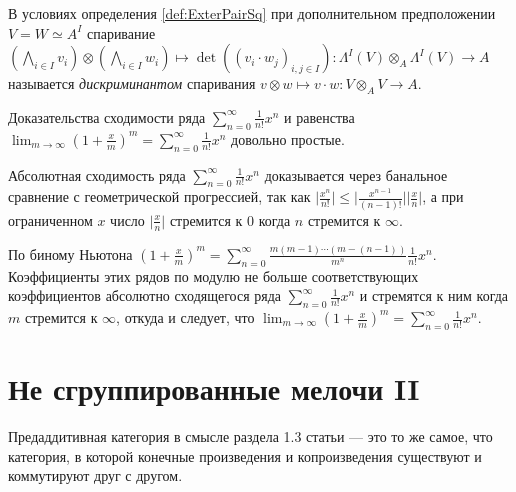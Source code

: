 \documentclass[
	extrafontsizes,
	11pt,
	hyphens,
]{memoir}
\begin{document}
\begin{definition}
В условиях определения \ref{def:ExterPairSq} при дополнительном предположении \(V = W \simeq A^I\) спаривание \((\bigwedge_{i \in I} v_i) \otimes (\bigwedge_{i \in I} w_i) \mapsto \det((v_i \cdot w_j)_{i,j \in I}) : \Lambda^I (V) \otimes_A \Lambda^I (V) \to A\) называется \emph{дискриминантом} спаривания \(v \otimes w \mapsto v \cdot w : V \otimes_A V \to A\).
\end{definition}

\begin{observation}
Доказательства сходимости ряда
\(\sum_{n=0}^\infty \frac{1}{n!} x^n\)
и равенства
\(\lim_{m \to \infty} (1 + \frac{x}{m})^m = \sum_{n=0}^\infty \frac{1}{n!} x^n\)
довольно простые.

Абсолютная сходимость ряда \(\sum_{n=0}^\infty \frac{1}{n!} x^n\) доказывается через банальное сравнение с геометрической прогрессией,
так как \(\lvert \frac{x^n}{n!} \rvert \leq \lvert \frac{x^{n-1}}{(n-1)!} \rvert \lvert \frac{x}{n} \rvert\), а при ограниченном \(x\) число \(\lvert \frac{x}{n} \rvert\) стремится к \(0\) когда \(n\) стремится к \(\infty\).

По биному Ньютона
\((1 + \frac{x}{m})^m = \sum_{n=0}^\infty \frac{m(m-1)\cdots{}(m-(n-1))}{m^n} \frac{1}{n!} x^n\).
Коэффициенты этих рядов по модулю не больше соответствующих коэффициентов абсолютно сходящегося ряда \(\sum_{n=0}^\infty \frac{1}{n!} x^n\) и стремятся к ним когда \(m\) стремится к \(\infty\), откуда и следует, что \(\lim_{m \to \infty} (1 + \frac{x}{m})^m = \sum_{n=0}^\infty \frac{1}{n!} x^n\).
\end{observation}


\section{Не сгруппированные мелочи II}

\begin{observation}
\label{obs:PreaddCatLim}
Предаддитивная категория в смысле раздела 1.3 статьи \cite{Kaledin_2022} --- это то же самое, что категория, в которой конечные произведения и копроизведения существуют и коммутируют друг с другом.
\end{observation}
\end{document}
